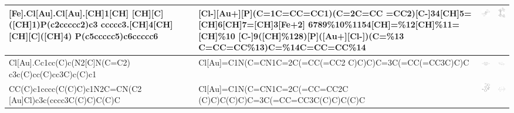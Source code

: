 \begin{landscape}
\begin{longtable}{m{7cm}m{8cm}m{2.3cm}m{2.3cm}}
 [Fe].Cl[Au].Cl[Au].[CH]1[CH] [CH][C]([CH]1)P(c2ccccc2)c3 ccccc3.[CH]4[CH][CH][C]([CH]4) P(c5ccccc5)c6ccccc6 & 
 [Cl-][Au+][P](C=1C=CC=CC1)(C=2C=CC =CC2)[C-]34[CH]5=[CH]6[CH]7=[CH]3[Fe+2] 6789\%10\%1154[CH]=\%12[CH]\%11=[CH]\%10 [C-]9([CH]\%128)[P]([Au+][Cl-])(C=\%13 C=CC=CC\%13)C=\%14C=CC=CC\%14 & 
 \includegraphics[width=2.5cm]{imagenes/sigmaAldrich/pdf/Bis(chlorogold(I)) [1,1-bis(diphenylphosphino)ferrocene.png} & 
 \includegraphics[width=2.2cm]{imagenes/sciFinder/pdf/Bis(chlorogold(I)) [1,1-bis(diphenylphosphino)ferrocene].pdf} \\
\hline


 Cl[Au].Cc1cc(C)c(N2[C]N(C=C2) c3c(C)cc(C)cc3C)c(C)c1 & 
 Cl[Au]=C1N(C=CN1C=2C(=CC(=CC2 C)C)C)C=3C(=CC(=CC3C)C)C & 
 \includegraphics[width=2.2cm]{imagenes/sigmaAldrich/pdf/[(IMes)AuCl].pdf} & 
 \includegraphics[width=2.2cm]{imagenes/sciFinder/pdf/[(IMes)AuCl].pdf} \\
\hline


 CC(C)c1cccc(C(C)C)c1N2C=CN(C2 [Au]Cl)c3c(cccc3C(C)C)C(C)C & 
 Cl[Au]=C1N(C=CN1C=2C(=CC=CC2C (C)C)C(C)C)C=3C(=CC=CC3C(C)C)C(C)C & 
 \includegraphics[width=2.2cm]{imagenes/sigmaAldrich/[(IPr)AuCl].png} & 
 \includegraphics[width=2.2cm]{imagenes/sciFinder/pdf/[(IPr)AuCl].pdf} \\
\hline


\end{longtable}
\end{landscape}
